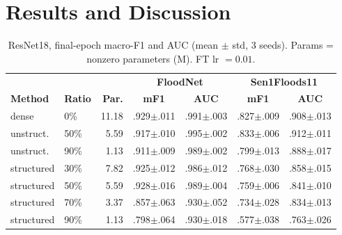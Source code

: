 \documentclass[conference]{IEEEtran}
\newif\ifreview
\newcommand{\REV}[1]{\ifreview\textcolor{red}{\textbf{[Revise: #1]}}\fi}
\begin{document}
\section{Results and Discussion}
\label{sec:results}

\begin{table}[t]
\centering
\caption{ResNet18, final-epoch macro-F1 and AUC (mean $\pm$ std, 3
seeds). Params = nonzero parameters (M). FT lr $=0.01$.}
\label{tab:resnet}
\footnotesize
\setlength{\tabcolsep}{3.4pt}
\begin{tabular}{llr cc cc}
\toprule
& & & \multicolumn{2}{c}{\textbf{FloodNet}} &
\multicolumn{2}{c}{\textbf{Sen1Floods11}}\\
\cmidrule(lr){4-5}\cmidrule(lr){6-7}
\textbf{Method} & \textbf{Ratio} & \textbf{Par.} &
\textbf{mF1} & \textbf{AUC} & \textbf{mF1} & \textbf{AUC}\\
\midrule
dense        & 0\%  & 11.18 & .929$\pm$.011 & .991$\pm$.003 & .827$\pm$.009 & .908$\pm$.013\\
\midrule
unstruct.    & 50\% &  5.59 & .917$\pm$.010 & .995$\pm$.002 & .833$\pm$.006 & .912$\pm$.011\\
unstruct.    & 90\% &  1.13 & .911$\pm$.009 & .989$\pm$.002 & .799$\pm$.013 & .888$\pm$.017\\
\midrule
structured   & 30\% &  7.82 & .925$\pm$.012 & .986$\pm$.012 & .768$\pm$.030 & .858$\pm$.015\\
structured   & 50\% &  5.59 & .928$\pm$.016 & .989$\pm$.004 & .759$\pm$.006 & .841$\pm$.010\\
structured   & 70\% &  3.37 & .857$\pm$.063 & .930$\pm$.052 & .734$\pm$.028 & .834$\pm$.013\\
structured   & 90\% &  1.13 & .798$\pm$.064 & .930$\pm$.018 & .577$\pm$.038 & .763$\pm$.026\\
\bottomrule
\end{tabular}
\end{table}
\REV{[A7] The abstract promises accuracy and balanced accuracy but no
table shows them. Add them (extra columns if space allows, otherwise a
compact table for dense + the key rows, Table~\ref{tab:acc} stub
below). Also add $\Delta$ vs.\ dense columns or bold the
dense-referenced differences so the main finding is visible at a
glance. Note that SAR dense AUC is only 0.908: the SAR baseline is
modest, so say that clearly.}
\end{document}
